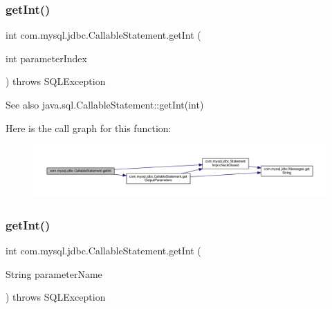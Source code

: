 \subsubsection{\texorpdfstring{get\+Int()}{getInt()}\hspace{0.1cm}{\footnotesize\ttfamily [1/2]}}
{\footnotesize\ttfamily int com.\+mysql.\+jdbc.\+Callable\+Statement.\+get\+Int (\begin{DoxyParamCaption}\item[{int}]{parameter\+Index }\end{DoxyParamCaption}) throws S\+Q\+L\+Exception}

\begin{DoxySeeAlso}{See also}
java.\+sql.\+Callable\+Statement\+::get\+Int(int) 
\end{DoxySeeAlso}
Here is the call graph for this function\+:\nopagebreak
\begin{figure}[H]
\begin{center}
\leavevmode
\includegraphics[width=350pt]{classcom_1_1mysql_1_1jdbc_1_1_callable_statement_a43b66c9bcf8be39ba1d4b5a05fbbfc0f_cgraph}
\end{center}
\end{figure}
\mbox{\label{classcom_1_1mysql_1_1jdbc_1_1_callable_statement_a73f5f0d0b8156cf0ad5f9cf4840761d7}} 
\subsubsection{\texorpdfstring{get\+Int()}{getInt()}\hspace{0.1cm}{\footnotesize\ttfamily [2/2]}}
{\footnotesize\ttfamily int com.\+mysql.\+jdbc.\+Callable\+Statement.\+get\+Int (\begin{DoxyParamCaption}\item[{String}]{parameter\+Name }\end{DoxyParamCaption}) throws S\+Q\+L\+Exception}

